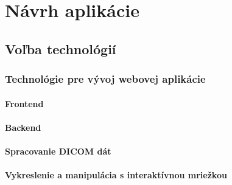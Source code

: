 \chapter {Návrh aplikácie}

\section {Voľba technológií}

\subsection {Technológie pre vývoj webovej aplikácie}

\subsubsection {Frontend}

\subsubsection {Backend}

\subsubsection {Spracovanie DICOM dát}

\subsubsection {Vykreslenie a manipulácia s interaktívnou mriežkou}
